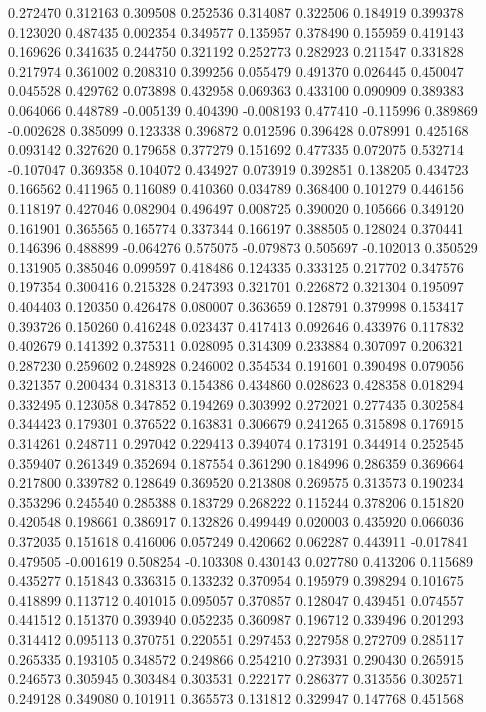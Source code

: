 0.272470
0.312163
0.309508
0.252536
0.314087
0.322506
0.184919
0.399378
0.123020
0.487435
0.002354
0.349577
0.135957
0.378490
0.155959
0.419143
0.169626
0.341635
0.244750
0.321192
0.252773
0.282923
0.211547
0.331828
0.217974
0.361002
0.208310
0.399256
0.055479
0.491370
0.026445
0.450047
0.045528
0.429762
0.073898
0.432958
0.069363
0.433100
0.090909
0.389383
0.064066
0.448789
-0.005139
0.404390
-0.008193
0.477410
-0.115996
0.389869
-0.002628
0.385099
0.123338
0.396872
0.012596
0.396428
0.078991
0.425168
0.093142
0.327620
0.179658
0.377279
0.151692
0.477335
0.072075
0.532714
-0.107047
0.369358
0.104072
0.434927
0.073919
0.392851
0.138205
0.434723
0.166562
0.411965
0.116089
0.410360
0.034789
0.368400
0.101279
0.446156
0.118197
0.427046
0.082904
0.496497
0.008725
0.390020
0.105666
0.349120
0.161901
0.365565
0.165774
0.337344
0.166197
0.388505
0.128024
0.370441
0.146396
0.488899
-0.064276
0.575075
-0.079873
0.505697
-0.102013
0.350529
0.131905
0.385046
0.099597
0.418486
0.124335
0.333125
0.217702
0.347576
0.197354
0.300416
0.215328
0.247393
0.321701
0.226872
0.321304
0.195097
0.404403
0.120350
0.426478
0.080007
0.363659
0.128791
0.379998
0.153417
0.393726
0.150260
0.416248
0.023437
0.417413
0.092646
0.433976
0.117832
0.402679
0.141392
0.375311
0.028095
0.314309
0.233884
0.307097
0.206321
0.287230
0.259602
0.248928
0.246002
0.354534
0.191601
0.390498
0.079056
0.321357
0.200434
0.318313
0.154386
0.434860
0.028623
0.428358
0.018294
0.332495
0.123058
0.347852
0.194269
0.303992
0.272021
0.277435
0.302584
0.344423
0.179301
0.376522
0.163831
0.306679
0.241265
0.315898
0.176915
0.314261
0.248711
0.297042
0.229413
0.394074
0.173191
0.344914
0.252545
0.359407
0.261349
0.352694
0.187554
0.361290
0.184996
0.286359
0.369664
0.217800
0.339782
0.128649
0.369520
0.213808
0.269575
0.313573
0.190234
0.353296
0.245540
0.285388
0.183729
0.268222
0.115244
0.378206
0.151820
0.420548
0.198661
0.386917
0.132826
0.499449
0.020003
0.435920
0.066036
0.372035
0.151618
0.416006
0.057249
0.420662
0.062287
0.443911
-0.017841
0.479505
-0.001619
0.508254
-0.103308
0.430143
0.027780
0.413206
0.115689
0.435277
0.151843
0.336315
0.133232
0.370954
0.195979
0.398294
0.101675
0.418899
0.113712
0.401015
0.095057
0.370857
0.128047
0.439451
0.074557
0.441512
0.151370
0.393940
0.052235
0.360987
0.196712
0.339496
0.201293
0.314412
0.095113
0.370751
0.220551
0.297453
0.227958
0.272709
0.285117
0.265335
0.193105
0.348572
0.249866
0.254210
0.273931
0.290430
0.265915
0.246573
0.305945
0.303484
0.303531
0.222177
0.286377
0.313556
0.302571
0.249128
0.349080
0.101911
0.365573
0.131812
0.329947
0.147768
0.451568
